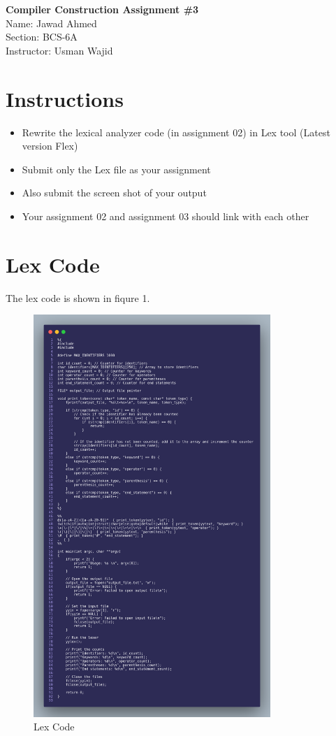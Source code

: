 \documentclass[12pt]{article}
\begin{document}
\begin{center}
{\LARGE\bfseries Compiler Construction Assignment \#3}\\[0.5em]
{\large Name: Jawad Ahmed}\\[0.5em]
{\large Section: BCS-6A}\\[0.5em]
{\large Instructor: Usman Wajid}\\[0.5em]
\end{center}

\section{Instructions}
\begin{itemize}
\item Rewrite the lexical analyzer code (in assignment 02) in Lex tool (Latest version Flex)
\item Submit only the Lex file as your assignment
\item Also submit the screen shot of your output
\item Your assignment  02 and assignment  03 should link with each other
\end{itemize}

\section{Lex Code}
The lex code is shown in fiqure 1.
\begin{figure}[htbp]
  \centering
  \includegraphics[width=0.8\textwidth]{code.png}
  \caption{Lex Code}
  \label{fig:example}
\end{figure}
\end{document}

